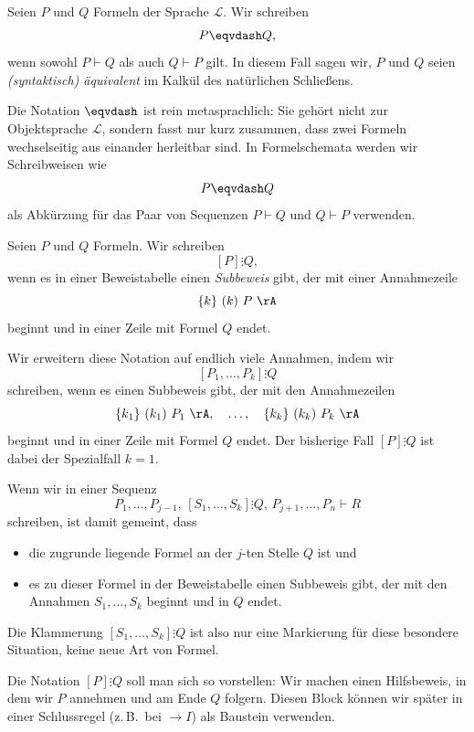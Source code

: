 \documentclass[main.tex]{subfiles}
\begin{document}
\begin{definition}
Seien \(P\) und \(Q\) Formeln der Sprache \(\mathcal L\).
Wir schreiben
\[
  P \eqvdash Q,
\]
wenn sowohl \(P \vdash Q\) als auch \(Q \vdash P\) gilt. In diesem Fall
sagen wir, \(P\) und \(Q\) seien \emph{(syntaktisch) äquivalent} im
Kalkül des natürlichen Schließens.

Die Notation \(\eqvdash\) ist rein metasprachlich: Sie gehört nicht zur
Objektsprache \(\mathcal L\), sondern fasst nur kurz zusammen, dass zwei
Formeln wechselseitig aus einander herleitbar sind. In Formelschemata
werden wir Schreibweisen wie
\[
  P \eqvdash Q
\]
als Abkürzung für das Paar von Sequenzen \(P \vdash Q\) und
\(Q \vdash P\) verwenden.
\end{definition}

\begin{definition}[Subbeweise]
Seien \(P\) und \(Q\) Formeln. Wir schreiben
\[
  [P]\vdots Q,
\]
wenn es in einer Beweistabelle einen \emph{Subbeweis} gibt, der mit einer
Annahmezeile
\[
  \{k\}\ (k)\ P\ \rA
\]
beginnt und in einer Zeile mit Formel \(Q\) endet.

Wir erweitern diese Notation auf endlich viele Annahmen, indem wir
\[
  [P_1,\dots,P_k]\vdots Q
\]
schreiben, wenn es einen Subbeweis gibt, der mit den Annahmezeilen
\[
  \{k_1\}\ (k_1)\ P_1\ \rA,\quad
  \dots,\quad
  \{k_k\}\ (k_k)\ P_k\ \rA
\]
beginnt und in einer Zeile mit Formel \(Q\) endet. Der bisherige Fall
\([P]\vdots Q\) ist dabei der Spezialfall \(k=1\).

Wenn wir in einer Sequenz
\[
  P_1,\dots,P_{j-1},\,[S_1,\dots,S_k]\vdots Q,\,P_{j+1},\dots,P_n \vdash R
\]
schreiben, ist damit gemeint, dass
\begin{itemize}
  \item die zugrunde liegende Formel an der \(j\)-ten Stelle \(Q\) ist und
  \item es zu dieser Formel in der Beweistabelle einen Subbeweis gibt, der
        mit den Annahmen \(S_1,\dots,S_k\) beginnt und in \(Q\) endet.
\end{itemize}
Die Klammerung \([S_1,\dots,S_k]\vdots Q\) ist also nur eine Markierung für
diese besondere Situation, keine neue Art von Formel.
\end{definition}

\begin{example}
  Die Notation \([P]\vdots Q\) soll man sich so vorstellen:
  Wir machen einen Hilfsbeweis, in dem wir \(P\) annehmen
  und am Ende \(Q\) folgern. Diesen Block können wir später
  in einer Schlussregel (z.\,B.\ bei \(\rightarrow I\)) als
  Baustein verwenden.
\end{example}
\end{document}
